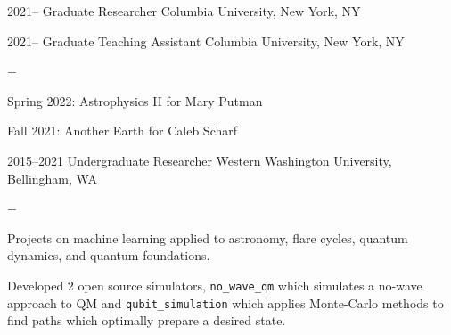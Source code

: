 \documentclass[]{scoggins-cv} %
\begin{document}
\begin{entrylist}


    \entry
    {2021--}
    {Graduate Researcher}
    {Columbia University, New York, NY}

  \entry
  {2021--}
  {Graduate Teaching Assistant}
  {Columbia University, New York, NY}
  {%
      \vspace{-1em}
      \begin{list}{{\color{numcolor}$-$}}{\cvlist}
        \item Spring 2022: Astrophysics II for Mary Putman
        \item Fall 2021: Another Earth for Caleb Scharf
      \end{list}
  }

    \entry
    {2015--2021}
    {Undergraduate Researcher}
    {Western Washington University, Bellingham, WA}
    {%
        \vspace{-1em}
        \begin{list}{{\color{numcolor}$-$}}{\cvlist}
            \item Projects on machine learning applied to astronomy, flare cycles,
            quantum dynamics, and quantum foundations.
            \item Developed 2 open source simulators, \texttt{no\_wave\_qm} which simulates
            a no-wave approach to QM and \texttt{qubit\_simulation} which applies Monte-Carlo
            methods to find paths which optimally prepare a desired state.
        \end{list}
    }

\end{entrylist}

\end{document}
